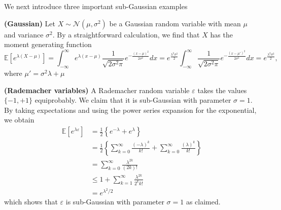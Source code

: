 \documentclass{article}
\newcommand{\bfs}[1]{\textbf{({#1})}}
\begin{document}
We next introduce three important sub-Gaussian examples

\begin{exma}{\bfs{Gaussian}}
Let $X \sim \mathcal{N}\left(\mu, \sigma^{2}\right)$ be a Gaussian random variable with mean $\mu$ and variance $\sigma^{2} .$ By a straightforward calculation, we find that $X$ has the moment generating function
$$
\mathbb{E}\left[e^{\lambda (X-\mu)}\right]=\int_{-\infty}^\infty e^{\lambda (x-\mu)} \frac{1}{\sqrt{2\sigma^2 \pi}} e^{-\frac{(x-\mu)^2}{2 \sigma^2}}dx = e^{\frac{\lambda^2\sigma^2}{2}} \int_{-\infty}^\infty \frac{1}{\sqrt{2\sigma^2 \pi}} e^{-\frac{(x-\mu')^2}{2 \sigma^2}} dx = e^{\frac{\lambda^2\sigma^2}{2}},
$$
where $\mu' = \sigma^2\lambda+\mu$
\end{exma}
\begin{exma}{\bfs{Rademacher variables}}
A Rademacher random variable $\varepsilon$ takes the values $\{-1,+1\}$ equiprobably. We claim that it is sub-Gaussian with parameter $\sigma=1$. By taking expectations and using the power series expansion for the exponential, we obtain
$$
\begin{aligned}
\mathbb{E}\left[e^{\lambda \varepsilon}\right] &=\frac{1}{2}\left\{e^{-\lambda}+e^{\lambda}\right\} \\
&=\frac{1}{2}\left\{\sum_{k=0}^{\infty} \frac{(-\lambda)^{k}}{k !}+\sum_{k=0}^{\infty} \frac{(\lambda)^{k}}{k !}\right\} \\
&=\sum_{k=0}^{\infty} \frac{\lambda^{2 k}}{(2 k) !} \\
& \leq 1+\sum_{k=1}^{\infty} \frac{\lambda^{2 k}}{2^{k} k !} \\
&=e^{\lambda^{2} / 2}
\end{aligned}
$$
which shows that $\varepsilon$ is sub-Gaussian with parameter $\sigma=1$ as claimed.
\end{exma}
\end{document}
